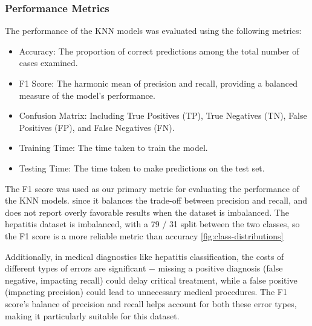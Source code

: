 \subsubsection*{Performance Metrics}

The performance of the KNN models was evaluated using the following metrics:

\begin{itemize}
    \item Accuracy: The proportion of correct predictions among the total number of cases examined.
    \item F1 Score: The harmonic mean of precision and recall, providing a balanced measure of the model's performance.
    \item Confusion Matrix: Including True Positives (TP), True Negatives (TN), False Positives (FP), and False Negatives (FN).
    \item Training Time: The time taken to train the model.
    \item Testing Time: The time taken to make predictions on the test set.
\end{itemize}

The F1 score was used as our primary metric for evaluating the performance of the KNN models.
since it balances the trade-off between precision and recall, and does not report overly favorable results when the dataset is imbalanced.
The hepatitis dataset is imbalanced, with a 79 / 31 split between the two classes, so the F1 score is a more reliable metric than accuracy \autoref{fig:class-distributions}

Additionally, in medical diagnostics like hepatitis classification, the costs of different types of errors are significant $-$ 
missing a positive diagnosis (false negative, impacting recall) could delay critical treatment,
while a false positive (impacting precision) could lead to unnecessary medical procedures.
The F1 score's balance of precision and recall helps account for both these error types, making it particularly suitable for this dataset.